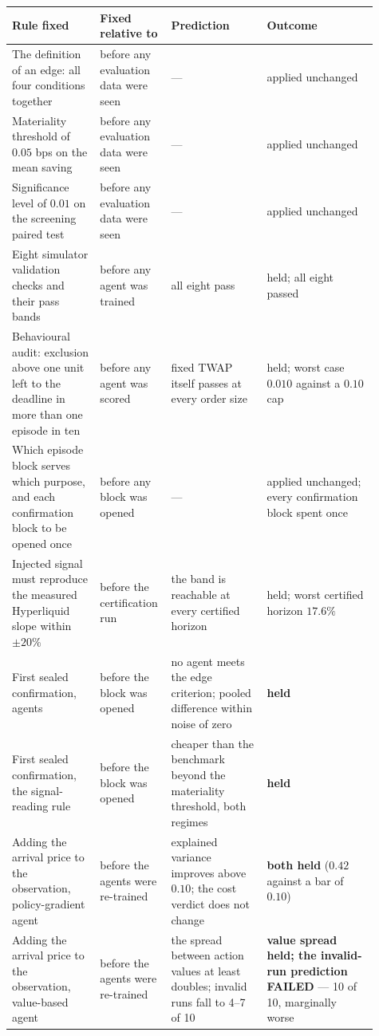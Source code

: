 \begin{tabular}{@{}>{\raggedright\arraybackslash}p{0.235\linewidth}>{\raggedright\arraybackslash}p{0.13\linewidth}>{\raggedright\arraybackslash}p{0.25\linewidth}>{\raggedright\arraybackslash}p{0.295\linewidth}@{}}
\toprule
\textbf{Rule fixed} & \textbf{Fixed relative to} & \textbf{Prediction} & \textbf{Outcome} \\
\midrule
The definition of an edge: all four conditions together & before any evaluation data were seen & --- & applied unchanged \\
Materiality threshold of $0.05$ bps on the mean saving & before any evaluation data were seen & --- & applied unchanged \\
Significance level of $0.01$ on the screening paired test & before any evaluation data were seen & --- & applied unchanged \\
Eight simulator validation checks and their pass bands & before any agent was trained & all eight pass & held; all eight passed \\
Behavioural audit: exclusion above one unit left to the deadline in more than one episode in ten & before any agent was scored & fixed TWAP itself passes at every order size & held; worst case $0.010$ against a $0.10$ cap \\
Which episode block serves which purpose, and each confirmation block to be opened once & before any block was opened & --- & applied unchanged; every confirmation block spent once \\
Injected signal must reproduce the measured Hyperliquid slope within $\pm20\%$ & before the certification run & the band is reachable at every certified horizon & held; worst certified horizon $17.6\%$ \\
First sealed confirmation, agents & before the block was opened & no agent meets the edge criterion; pooled difference within noise of zero & \textbf{held} \\
First sealed confirmation, the signal-reading rule & before the block was opened & cheaper than the benchmark beyond the materiality threshold, both regimes & \textbf{held} \\
Adding the arrival price to the observation, policy-gradient agent & before the agents were re-trained & explained variance improves above $0.10$; the cost verdict does not change & \textbf{both held} ($0.42$ against a bar of $0.10$) \\
Adding the arrival price to the observation, value-based agent & before the agents were re-trained & the spread between action values at least doubles; invalid runs fall to 4--7 of 10 & \textbf{value spread held; the invalid-run prediction FAILED} --- 10 of 10, marginally worse \\

\end{tabular}
